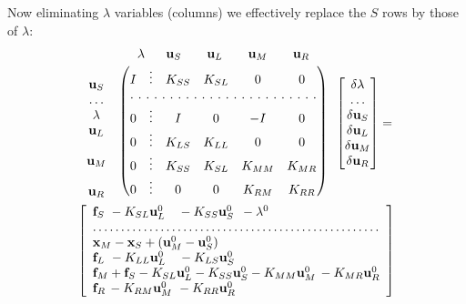 \documentclass[11pt]{article}
\newcommand{\vecx}{{\bf x}}
\newcommand{\vecu}{{\bf u}}
\newcommand{\vecf}{{\bf f}}
\begin{document}
Now eliminating $\lambda$ variables (columns) we effectively replace the $S$ rows by those of $\lambda$:
\begin{multline}
\label{eq:J_partial_elimination}
\begin{array}{lc}  &  \begin{array}{ccccc} \lambda \ \  & \vecu_S \quad & \vecu_L \quad & \vecu_M & \quad \vecu_R \end{array}\\
\begin{matrix} \\ \vecu_S  \\ \dots \\ \lambda \\ \vecu_L \\ \\ \vecu_M \\ \\ \vecu_R\end{matrix} &
\begin{pmatrix}
  I & \vdots & K_{SS}& K_{SL} &  0 & 0\\
  \hdotsfor[2]{6}\\
  0 &\vdots & I     &   0    & -I   & 0\\
  0 &\vdots & K_{LS}&   K_{LL}&  0   & 0\\
  0 &\vdots & K_{SS}&   K_{SL}& K_{MM}& K_{MR}\\
  0 &\vdots & 0     &    0   & K_{RM} & K_{RR}
\end{pmatrix}
\end{array}
\begin{bmatrix}
\delta \lambda\\ \dots \\ \delta \vecu_S \\ \delta \vecu_L \\ \delta \vecu_M \\ \delta \vecu_R
\end{bmatrix}
=\\
\left[\begin{array}{l}
\vecf_S \ - K_{SL} \vecu_L^0 \ \ \ - K_{SS} \vecu_S^0 \ \,- \lambda^0\\
\dots\dots\dots\dots\dots\dots\dots\dots\dots\dots\dots\dots\dots\dots\dots\dots\dots\\
\vecx_M - \vecx_S + (\vecu_M^0 - \vecu_S^0)\\
\vecf_L \ - K_{LL} \vecu_L^0 \ \ \ - K_{LS} \vecu_S^0 \\
\vecf_M + \vecf_S - K_{SL} \vecu_L^0 - K_{SS} \vecu_S^0 - K_{MM} \vecu_M^0 \, - K_{MR} \vecu_R^0\\
\vecf_R \, - K_{RM} \vecu_M^0 \ - K_{RR} \vecu_R^0 \\
\end{array}\right]
\end{multline}
\end{document}
